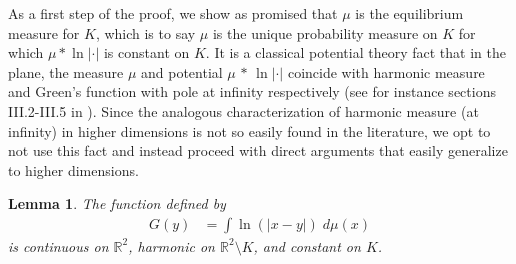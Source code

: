 \documentclass[JEP,XML,SOM,Unicode,published]{cedram}
\let\sm\setminus
\numberwithin{equation}{section}
\theoremstyle{plain}
\newtheorem{lem}{Lemma}[section]
\theoremstyle{definition}
\newcommand{\R}{\mathbb{R}}
\let\sm\setminus
\newcommand{\R}{\mathbb{R}}
\begin{document}
As a first step of the proof, we show as promised that $\mu$ is the equilibrium measure for $K$, which is to say $\mu$ is the unique probability measure on $K$ for which $\mu * \ln | \cdot |$ is constant on $K$. It is a classical potential theory fact that in the plane, the measure $\mu$ and potential $\mu \, * \, \ln | \cdot |$ coincide with harmonic measure and Green's function with pole at infinity respectively (see for instance sections III.2-III.5 in \cite{GM05}). Since the analogous characterization of harmonic measure (at infinity) in higher dimensions is not so easily found in the literature, we opt to not use this fact and instead proceed with direct arguments that easily generalize to higher dimensions.

	\begin{lem}\label{lg1}
	The function defined by
	\begin{align*}
	G(y) & = \int \ln(|x-y|) \; d\mu(x)
	\end{align*}
	is continuous on $\R^2$, harmonic on $\R^2 \sm K$, and constant on $K$.
	\end{lem}
\end{document}
